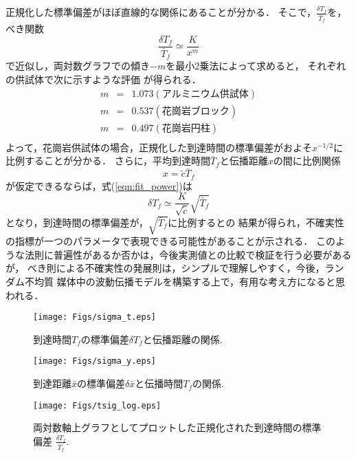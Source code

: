 正規化した標準偏差がほぼ直線的な関係にあることが分かる．
そこで，$\frac{\delta T_f}{\bar{T}_f}$を，べき関数
\begin{equation}
	\frac{\delta T_f }{\bar{T}_f} \simeq \frac{K}{x^m}
	\label{eqn:fit_power}
\end{equation}
で近似し，両対数グラフでの傾き$-m$を最小2乗法によって求めると，
それぞれの供試体で次に示すような評価
が得られる．
\begin{eqnarray}
	m &=& 1.073 (アルミニウム供試体) \\
	m &=& 0.537 (花崗岩ブロック)\\
	m &=& 0.497 (花崗岩円柱)\\
\end{eqnarray}
よって，花崗岩供試体の場合，正規化した到達時間の標準偏差がおよそ$x^{-1/2}$に比例することが分かる．
さらに，平均到達時間$\bar T_f$と伝播距離$x$の間に比例関係
\begin{equation}
	x=\tilde c \bar T_f
	\label{linfit_x}
\end{equation}
が仮定できるならば，式(\ref{eqn:fit_power})は
\begin{equation}
	\delta T_f \simeq \frac{K}{\sqrt{\tilde c}}\sqrt{ \bar{T}_f}
	\label{eqn:plaw} 
\end{equation}
となり，到達時間の標準偏差が，$\sqrt{\bar{T}_f}$に比例するとの
結果が得られ，不確実性の指標が一つのパラメータで表現できる可能性があることが示される．
このような法則に普遍性があるか否かは，今後実測値との比較で検証を行う必要があるが，
べき則による不確実性の発展則は，シンプルで理解しやすく，今後，ランダム不均質
媒体中の波動伝播モデルを構築する上で，有用な考え方になると思われる．
\begin{figure}
\begin{center}
	\texttt{[image: Figs/sigma\_t.eps]}
	\caption{到達時間$T_f$の標準偏差$\delta T_f$と伝播距離の関係. }
	\label{fig:fig13}
\end{center}
\end{figure}
\begin{figure}
\begin{center}
	\texttt{[image: Figs/sigma\_y.eps]}
	\caption{到達距離$\bar{x}$の標準偏差$\delta \bar{x}$と伝播時間$T_f$の関係. }
	\label{fig:fig14}
\end{center}
\end{figure}
\begin{figure}
\begin{center}
	\texttt{[image: Figs/tsig\_log.eps]}
	\caption{
		両対数軸上グラフとしてプロットした正規化された到達時間の標準偏差
			$\frac{\delta T_f}{\bar{T}_f}$. 
		}
	\label{fig:fig15}
\end{center}
\end{figure}
